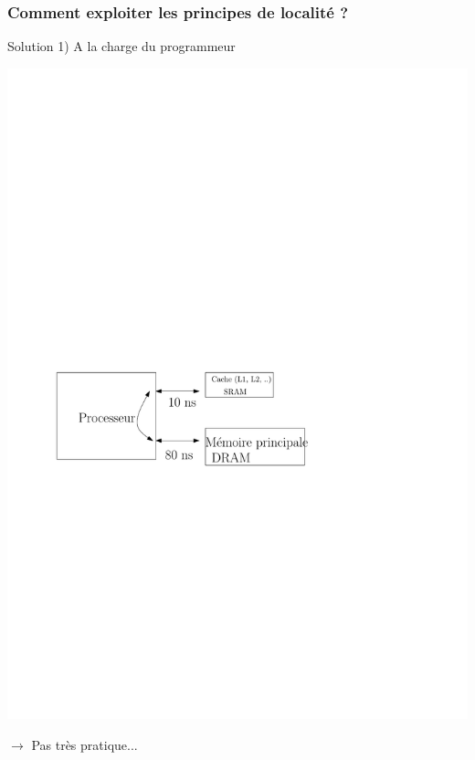 \documentclass{beamer}
\begin{document}
\begin{frame}
\frametitle{Comment exploiter les principes de localité ?}

\begin{block}{Solution 1) A la charge du programmeur}

\centering\includegraphics[width=\linewidth]{Figs/nocache_mem}

\end{block}

$\rightarrow$ Pas très pratique...

\end{frame}
\end{document}
